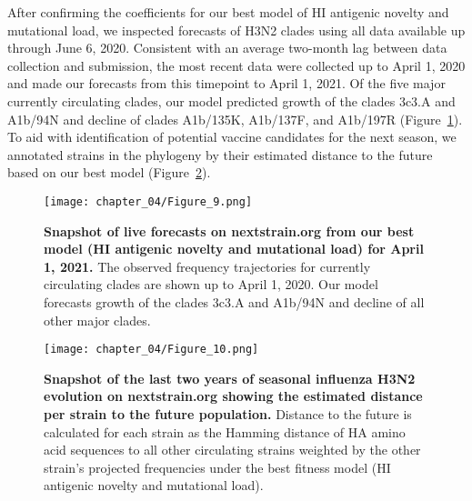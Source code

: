 After confirming the coefficients for our best model of HI antigenic novelty and mutational load, we inspected forecasts of H3N2 clades using all data available up through June 6, 2020.
Consistent with an average two-month lag between data collection and submission, the most recent data were collected up to April 1, 2020 and made our forecasts from this timepoint to April 1, 2021.
Of the five major currently circulating clades, our model predicted growth of the clades 3c3.A and A1b/94N and decline of clades A1b/135K, A1b/137F, and A1b/197R (Figure~\ref{fig:nextstrain_forecasts}).
To aid with identification of potential vaccine candidates for the next season, we annotated strains in the phylogeny by their estimated distance to the future based on our best model (Figure~\ref{fig:nextstrain_distance_to_future}).

\begin{figure}
  \begin{center}
  \texttt{[image: chapter\_04/Figure\_9.png]}
  \caption[{Snapshot of live forecasts on nextstrain.org from our best model (HI antigenic novelty and mutational load) for April 1, 2021.}]{
    {\bf Snapshot of live forecasts on nextstrain.org from our best model (HI antigenic novelty and mutational load) for April 1, 2021.}
    The observed frequency trajectories for currently circulating clades are shown up to April 1, 2020.
    Our model forecasts growth of the clades 3c3.A and A1b/94N and decline of all other major clades.
  }
  \label{fig:nextstrain_forecasts}
  \end{center}
\end{figure}

\begin{figure}
  \begin{center}
  \texttt{[image: chapter\_04/Figure\_10.png]}
  \caption[{Snapshot of the last two years of seasonal influenza H3N2 evolution on nextstrain.org showing the estimated distance per strain to the future population.}]{
    {\bf Snapshot of the last two years of seasonal influenza H3N2 evolution on nextstrain.org showing the estimated distance per strain to the future population.}
    Distance to the future is calculated for each strain as the Hamming distance of HA amino acid sequences to all other circulating strains weighted by the other strain's projected frequencies under the best fitness model (HI antigenic novelty and mutational load).
  }
  \label{fig:nextstrain_distance_to_future}
  \end{center}
\end{figure}

